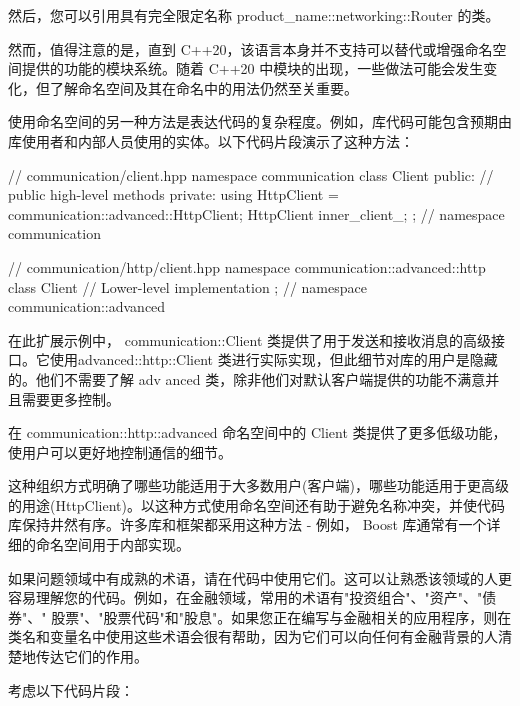 然后，您可以引用具有完全限定名称 product\_name::networking::Router 的类。

然而，值得注意的是，直到 C++20，该语言本身并不支持可以替代或增强命名空间提供的功能的模块系统。随着 C++20 中模块的出现，一些做法可能会发生变化，但了解命名空间及其在命名中的用法仍然至关重要。

使用命名空间的另一种方法是表达代码的复杂程度。例如，库代码可能包含预期由库使用者和内部人员使用的实体。以下代码片段演示了这种方法：

\begin{cpp}
// communication/client.hpp
namespace communication {
class Client {
public:
    // public high-level methods
private:
    using HttpClient = communication::advanced::HttpClient;
    HttpClient inner_client_;
};
} // namespace communication

// communication/http/client.hpp
namespace communication::advanced::http {
class Client {
    // Lower-level implementation
};
} // namespace communication::advanced
\end{cpp}

在此扩展示例中， communication::Client 类提供了用于发送和接收消息的高级接口。它使用advanced::http::Client 类进行实际实现，但此细节对库的用户是隐藏的。他们不需要了解 adv anced 类，除非他们对默认客户端提供的功能不满意并且需要更多控制。

在 communication::http::advanced 命名空间中的 Client 类提供了更多低级功能，使用户可以更好地控制通信的细节。

这种组织方式明确了哪些功能适用于大多数用户(客户端)，哪些功能适用于更高级的用途(HttpClient)。以这种方式使用命名空间还有助于避免名称冲突，并使代码库保持井然有序。许多库和框架都采用这种方法 - 例如， Boost 库通常有一个详细的命名空间用于内部实现。


如果问题领域中有成熟的术语，请在代码中使用它们。这可以让熟悉该领域的人更容易理解您的代码。例如，在金融领域，常用的术语有"投资组合"、"资产"、"债券"、" 股票"、"股票代码"和"股息"。如果您正在编写与金融相关的应用程序，则在类名和变量名中使用这些术语会很有帮助，因为它们可以向任何有金融背景的人清楚地传达它们的作用。

考虑以下代码片段：

